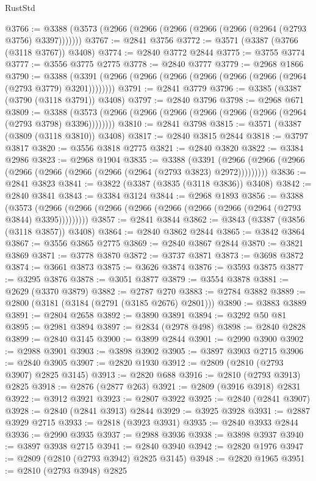 \begin{lexlean}{RustStd}
\begin{coremodule}
@3766 := @3388 (@3573 (@2966 (@2966 (@2966 (@2966 (@2966 (@2964 (@2793 @3756) @3397)))))))
@3767 := @2841 @3756
@3772 := @3571 (@3387 (@3766 (@3118 @3767)) @3408)
@3774 := @2840 @3772 @2844
@3775 := @3755 @3774
@3777 := @3556 @3775 @2775
@3778 := @2840 @3777
@3779 := @2968 @1866
@3790 := @3388 (@3391 (@2966 (@2966 (@2966 (@2966 (@2966 (@2966 (@2964 (@2793 @3779) @3201))))))))
@3791 := @2841 @3779
@3796 := @3385 (@3387 (@3790 (@3118 @3791)) @3408)
@3797 := @2840 @3796
@3798 := @2968 @671
@3809 := @3388 (@3573 (@2966 (@2966 (@2966 (@2966 (@2966 (@2966 (@2964 (@2793 @3798) @3396))))))))
@3810 := @2841 @3798
@3815 := @3571 (@3387 (@3809 (@3118 @3810)) @3408)
@3817 := @2840 @3815 @2844
@3818 := @3797 @3817
@3820 := @3556 @3818 @2775
@3821 := @2840 @3820
@3822 := @3384 @2986
@3823 := @2968 @1904
@3835 := @3388
    (@3391 (@2966 (@2966 (@2966 (@2966 (@2966 (@2966 (@2966 (@2964 (@2793 @3823) @2972)))))))))
@3836 := @2841 @3823
@3841 := @3822 (@3387 (@3835 (@3118 @3836)) @3408)
@3842 := @2840 @3841
@3843 := @3384 @3124
@3844 := @2968 @1893
@3856 := @3388
    (@3573 (@2966 (@2966 (@2966 (@2966 (@2966 (@2966 (@2966 (@2964 (@2793 @3844) @3395)))))))))
@3857 := @2841 @3844
@3862 := @3843 (@3387 (@3856 (@3118 @3857)) @3408)
@3864 := @2840 @3862 @2844
@3865 := @3842 @3864
@3867 := @3556 @3865 @2775
@3869 := @2840 @3867 @2844
@3870 := @3821 @3869
@3871 := @3778 @3870
@3872 := @3737 @3871
@3873 := @3698 @3872
@3874 := @3661 @3873
@3875 := @3626 @3874
@3876 := @3593 @3875
@3877 := @3295 @3876
@3878 := @3051 @3877
@3879 := @3554 @3878
@3881 := @2629 (@3370 @3879)
@3882 := @2787 @270
@3883 := @2784 @3882
@3889 := @2800 (@3181 (@3184 (@2791 (@3185 @2676) @2801)))
@3890 := @3883 @3889
@3891 := @2804 @2658
@3892 := @3890 @3891
@3894 := @3292 @50 @81
@3895 := @2981 @3894
@3897 := @2834 (@2978 @498)
@3898 := @2840 @2828
@3899 := @2840 @3145
@3900 := @3899 @2844
@3901 := @2990 @3900
@3902 := @2988 @3901
@3903 := @3898 @3902
@3905 := @3897 @3903 @2715
@3906 := @2840 @3905
@3907 := @2820 @1930
@3912 := @2809 (@2810 (@2793 @3907) @2825 @3145)
@3913 := @2820 @688
@3916 := @2810 (@2793 @3913) @2825
@3918 := @2876 (@2877 @263)
@3921 := @2809 (@3916 @3918) @2831
@3922 := @3912 @3921
@3923 := @2807 @3922
@3925 := @2840 (@2841 @3907)
@3928 := @2840 (@2841 @3913) @2844
@3929 := @3925 @3928
@3931 := @2887 @3929 @2715
@3933 := @2818 (@3923 @3931)
@3935 := @2840 @3933 @2844
@3936 := @2990 @3935
@3937 := @2988 @3936
@3938 := @3898 @3937
@3940 := @3897 @3938 @2715
@3941 := @2840 @3940
@3942 := @2820 @1976
@3947 := @2809 (@2810 (@2793 @3942) @2825 @3145)
@3948 := @2820 @1965
@3951 := @2810 (@2793 @3948) @2825

\end{coremodule}
\end{lexlean}
